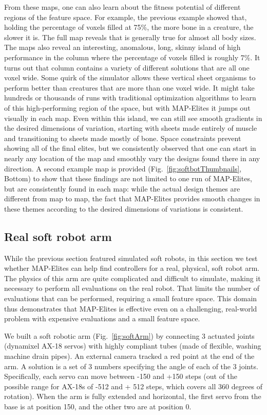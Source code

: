 \documentclass[twocolumn, DIV25, 9pt]{scrartcl}
\begin{document}
From these maps, one can also learn about the fitness potential of different regions of the feature space. For example, the previous example showed that, holding the percentage of voxels filled at 75\%, the more bone in a creature, the slower it is. The full map reveals that is generally true for almost all body sizes. The maps also reveal an interesting, anomalous, long, skinny island of high performance in the column where the percentage of voxels filled is roughly 7\%. It turns out that column contains a variety of different solutions that are all one voxel wide. Some quirk of the simulator allows these vertical sheet organisms to perform better than creatures that are more than one voxel wide. It might take hundreds or thousands of runs with traditional optimization algorithms to learn of this high-performing region of the space, but with MAP-Elites it jumps out visually in each map. Even within this island, we can still see smooth gradients in the desired dimensions of variation, starting with sheets made entirely of muscle and transitioning to sheets made mostly of bone. Space constraints prevent showing all of the final elites, but we consistently observed that one can start in nearly any location of the map and smoothly vary the designs found there in any direction. A second example map is provided (Fig.~\ref{fig:softbotThumbnails}, Bottom) to show that these findings are not limited to one run of MAP-Elites, but are consistently found in each map: while the actual design themes are different from map to map, the fact that MAP-Elites provides smooth changes in these themes according to the desired dimensions of variations is consistent. 

%
%
%
%
%
%

\subsection{Real soft robot arm}

While the previous section featured simulated soft robots, in this section we test whether MAP-Elites can help find controllers for a real, physical, soft robot arm. The physics of this arm are quite complicated and difficult to simulate, making it necessary to perform all evaluations on the real robot.  That limits the number of evaluations that can be performed, requiring a small feature space. This domain thus demonstrates that MAP-Elites is effective even on a challenging, real-world problem with expensive evaluations and a small feature space. 

We built a soft robotic arm (Fig.~\ref{fig:softArm}) by connecting 3 actuated joints (dynamixel AX-18 servos) with highly compliant tubes (made of flexible, washing machine drain pipes). An external camera tracked a red point at the end of the arm. A solution is a set of 3 numbers specifying the angle of each of the 3 joints. Specifically, each servo can move between -150 and +150 steps (out of the possible range for AX-18s of -512 and + 512 steps, which covers all 360 degrees of rotation). When the arm is fully extended and horizontal, the first servo from the base is at position 150, and the other two are at position 0. 
\end{document}
